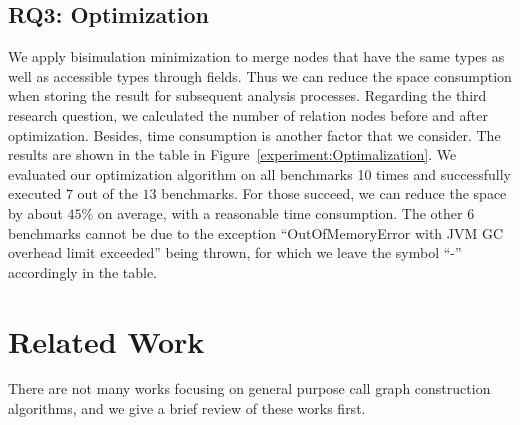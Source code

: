\documentclass{llncs}
\begin{document}
\subsection{RQ3: Optimization}\label{subsec:optimization}

We apply bisimulation minimization to merge nodes that have the same types as well as accessible types through fields. Thus we can reduce the space consumption when storing the result for subsequent analysis processes. Regarding the third research question, we calculated the number of relation nodes before and after optimization. Besides, time consumption is another factor that we consider. The results are shown in the table in Figure~\ref{experiment:Optimalization}. We evaluated our optimization algorithm on all benchmarks 10 times and successfully executed $7$ out of the $13$ benchmarks. For those succeed, we can reduce the space by about $45\%$ on average, with a reasonable time consumption. The other $6$ benchmarks cannot be due to the exception ``OutOfMemoryError with JVM GC overhead limit exceeded'' being thrown, for which we leave the symbol ``-'' accordingly in the table.


\section{Related Work}\label{sec:related-work}

There are not many works focusing on general purpose call graph construction algorithms, and we give a brief review of these works first.
\end{document}
